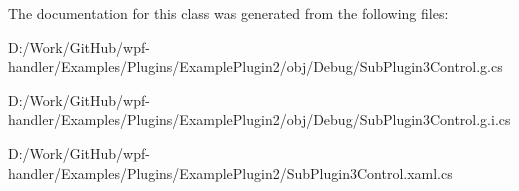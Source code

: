 The documentation for this class was generated from the following files\+:\begin{DoxyCompactItemize}
\item 
D\+:/\+Work/\+Git\+Hub/wpf-\/handler/\+Examples/\+Plugins/\+Example\+Plugin2/obj/\+Debug/Sub\+Plugin3\+Control.\+g.\+cs\item 
D\+:/\+Work/\+Git\+Hub/wpf-\/handler/\+Examples/\+Plugins/\+Example\+Plugin2/obj/\+Debug/Sub\+Plugin3\+Control.\+g.\+i.\+cs\item 
D\+:/\+Work/\+Git\+Hub/wpf-\/handler/\+Examples/\+Plugins/\+Example\+Plugin2/Sub\+Plugin3\+Control.\+xaml.\+cs\end{DoxyCompactItemize}
